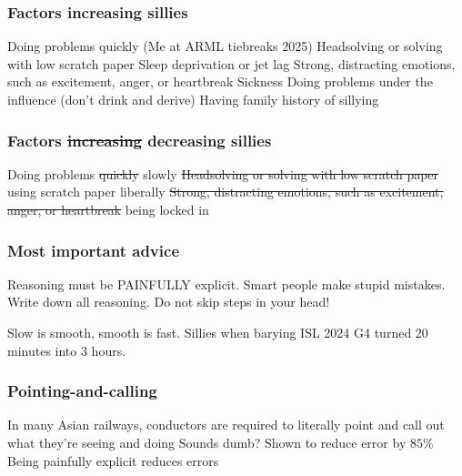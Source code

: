 \documentclass{beamer}
\newcommand{\st}{\sout}
\begin{document}
\begin{frame}
    \frametitle{Factors increasing sillies}
    \begin{itemize}
        \ii Doing problems quickly (Me at ARML tiebreaks 2025)
        \ii Headsolving or solving with low scratch paper
        \ii Sleep deprivation or jet lag
        \ii Strong, distracting emotions, such as excitement, anger, or heartbreak
        \ii Sickness
        \pit Doing problems under the influence (don't drink and derive)
        \pit Having family history of sillying
    \end{itemize}
\end{frame}

\begin{frame}
    \frametitle{Factors \st{increasing} \alert{decreasing} sillies} %
    \begin{itemize}
        \ii Doing problems \st{quickly} \alert{slowly}
        \ii \st{Headsolving or solving with low scratch paper} \alert{using scratch paper liberally}
        \ii \st{Strong, distracting emotions, such as excitement, anger, or heartbreak} \alert{being locked in}
    \end{itemize}
\end{frame}

\begin{frame}
    \frametitle{Most important advice}
    \alert{Reasoning must be PAINFULLY explicit.} Smart people make stupid mistakes. Write down all reasoning. Do not skip steps in your head!

    \medskip

    Slow is smooth, smooth is fast. Sillies when barying ISL 2024 G4 turned 20 minutes into 3 hours.
\end{frame}

\begin{frame}
    \frametitle{Pointing-and-calling}
    \begin{itemize}
        \ii In many Asian railways, conductors are required to literally point and call out what they're seeing and doing
        \ii Sounds dumb? Shown to reduce error by $85\%$
        \ii Being painfully explicit reduces errors
    \end{itemize}
\end{frame}
\end{document}
